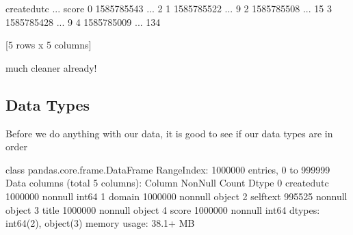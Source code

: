 \documentclass[letterpaper,10pt,english]{jupyterBook}
\begin{document}
\begin{sphinxVerbatim}[commandchars=\\\{\}]
  \PYG{p}{[}      \PYG{p}{]}
\end{sphinxVerbatim}

\begin{sphinxVerbatim}[commandchars=\\\{\}]
   created\PYGZus{}utc  ... score
0   1585785543  ...     2
1   1585785522  ...     9
2   1585785508  ...    15
3   1585785428  ...     9
4   1585785009  ...   134

[5 rows x 5 columns]
\end{sphinxVerbatim}

\sphinxAtStartPar
much cleaner already!


\subsection{Data Types}
\label{\detokenize{c7_case_studies/Jokes:data-types}}
\sphinxAtStartPar
Before we do anything with our data, it is good to see if our data types are in order

\begin{sphinxVerbatim}[commandchars=\\\{\}]
\end{sphinxVerbatim}

\begin{sphinxVerbatim}[commandchars=\\\{\}]
\PYGZlt{}class \PYGZsq{}pandas.core.frame.DataFrame\PYGZsq{}\PYGZgt{}
RangeIndex: 1000000 entries, 0 to 999999
Data columns (total 5 columns):
 \PYGZsh{}   Column       Non\PYGZhy{}Null Count    Dtype 
\PYGZhy{}\PYGZhy{}\PYGZhy{}  \PYGZhy{}\PYGZhy{}\PYGZhy{}\PYGZhy{}\PYGZhy{}\PYGZhy{}       \PYGZhy{}\PYGZhy{}\PYGZhy{}\PYGZhy{}\PYGZhy{}\PYGZhy{}\PYGZhy{}\PYGZhy{}\PYGZhy{}\PYGZhy{}\PYGZhy{}\PYGZhy{}\PYGZhy{}\PYGZhy{}    \PYGZhy{}\PYGZhy{}\PYGZhy{}\PYGZhy{}\PYGZhy{} 
 0   created\PYGZus{}utc  1000000 non\PYGZhy{}null  int64 
 1   domain       1000000 non\PYGZhy{}null  object
 2   selftext     995525 non\PYGZhy{}null   object
 3   title        1000000 non\PYGZhy{}null  object
 4   score        1000000 non\PYGZhy{}null  int64 
dtypes: int64(2), object(3)
memory usage: 38.1+ MB
\end{sphinxVerbatim}
\end{document}
